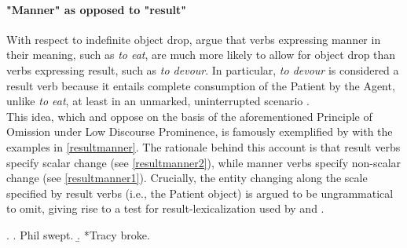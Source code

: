 \paragraph{"Manner" as opposed to "result"} 
With respect to indefinite object drop, \textcite{RappaportLevin1998building, RappaportHovavLevin2005, LevinRappaportHovav2008, RappaportHovavLevin2010} argue that verbs expressing manner in their meaning, such as \textit{to eat}, are much more likely to allow for object drop than verbs expressing result, such as \textit{to devour}. In particular, \textit{to devour} is considered a result verb because it entails complete consumption of the Patient by the Agent, unlike \textit{to eat}, at least in an unmarked, uninterrupted scenario \parencite{Melchin2019, smollett2005quantized, pinon2008aspectual}.\\
This idea, which \textcite{Goldberg2001} and \textcite{Onozuka2007} oppose on the basis of the aforementioned Principle of Omission under Low Discourse Prominence, is famously exemplified by \textcite{RappaportLevin1998building} with the examples in \ref{resultmanner}. The rationale behind this account is that result verbs specify scalar change (see \ref{resultmanner2}), while manner verbs specify non-scalar change (see \ref{resultmanner1}). Crucially, the entity changing along the scale specified by result verbs (i.e., the Patient object) is argued to be ungrammatical to omit, giving rise to a test for result-lexicalization used by \textcite{BeaversKoontzGarboden2012} and \textcite{Rissman2016}.

\ex. \label{resultmanner} \a. \label{resultmanner1} Phil swept.
\b. \label{resultmanner2} *Tracy broke.

